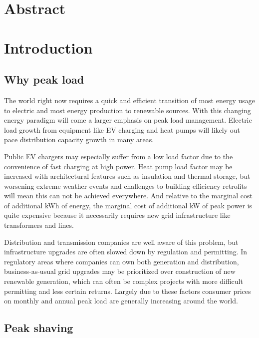 \documentclass[
]{article}
\author{}
\date{}
\begin{document}
\hypertarget{abstract}{%
\section{Abstract}\label{abstract}}

\hypertarget{introduction}{%
\section{Introduction}\label{introduction}}

\hypertarget{why-peak-load}{%
\subsection{Why peak load}\label{why-peak-load}}

The world right now requires a quick and efficient transition of most
energy usage to electric and most energy production to renewable
sources. With this changing energy paradigm will come a larger emphasis
on peak load management. Electric load growth from equipment like EV
charging and heat pumps will likely out pace distribution capacity
growth in many areas.

Public EV chargers may especially suffer from a low load factor due to
the convenience of fast charging at high power. Heat pump load factor
may be increased with architectural features such as insulation and
thermal storage, but worsening extreme weather events and challenges to
building efficiency retrofits will mean this can not be achieved
everywhere. And relative to the marginal cost of additional kWh of
energy, the marginal cost of additional kW of peak power is quite
expensive because it necessarily requires new grid infrastructure like
transformers and lines.

Distribution and transmission companies are well aware of this problem,
but infrastructure upgrades are often slowed down by regulation and
permitting. In regulatory areas where companies can own both generation
and distribution, business-as-usual grid upgrades may be prioritized
over construction of new renewable generation, which can often be
complex projects with more difficult permitting and less certain
returns. Largely due to these factors consumer prices on monthly and
annual peak load are generally increasing around the world.

\hypertarget{peak-shaving}{%
\subsection{Peak shaving}\label{peak-shaving}}
\end{document}
